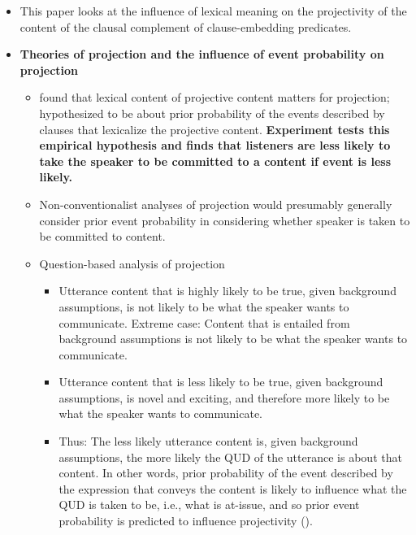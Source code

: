 \documentclass[11pt,fleqn]{article}
\newcommand{\6}{\mbox{$[\hspace*{-.6mm}[$}}
\newcommand{\9}{\mbox{$]\hspace*{-.6mm}]$}}
\begin{document}
\begin{itemize}

\item This paper looks at the influence of lexical meaning on the projectivity of the content of the clausal complement of clause-embedding predicates.


\item {\bf Theories of projection and the influence of event probability on projection}

\begin{itemize}

\item \citealt*{tbd-variability} found that lexical content of projective content matters for projection; hypothesized to be about prior probability of the events described by clauses that lexicalize the projective content. {\bf Experiment tests this empirical hypothesis and finds that listeners are less likely to take the speaker to be committed to a content if event is less likely.}

\item Non-conventionalist analyses of projection would presumably generally consider prior event probability in considering whether speaker is taken to be committed to content.

\item Question-based analysis of projection

\begin{itemize}

\item Utterance content that is highly likely to be true, given background assumptions, is not likely to be what the speaker wants to communicate. Extreme case: Content that is entailed from background assumptions is not likely to be what the speaker wants to communicate. 

\item Utterance content that is less likely to be true, given background assumptions, is novel and exciting, and therefore more likely to be what the speaker wants to communicate. 

\item Thus: The less likely utterance content is, given background assumptions, the more likely the QUD of the utterance is about that content. In other words, prior probability of the event described by the expression that conveys the content is likely to influence what the QUD is taken to be, i.e., what is at-issue, and so prior event probability is predicted to influence projectivity (\citealt{brst-salt10,tbd-variability}).


\end{itemize}
\end{itemize}
\end{itemize}
\end{document}
